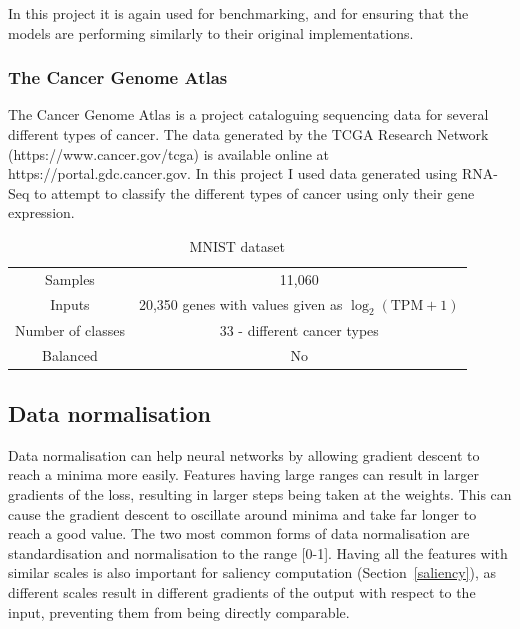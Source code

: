 In this project it is again used for benchmarking, and for ensuring that the models are performing similarly to their original implementations.

\subsubsection{The Cancer Genome Atlas}
The Cancer Genome Atlas is a project cataloguing sequencing data for several different types of cancer. The data generated by the TCGA Research 
Network (https://www.cancer.gov/tcga) is available online at https://portal.gdc.cancer.gov. In this project I used data generated using 
RNA-Seq to attempt to classify the different types of cancer using only their gene expression.
\begin{table}[H]
  \label{tab:tcga}
  \small %
  \centering %
  \begin{tabular}{cc} %
  \toprule[\heavyrulewidth]
  Samples & 11,060 \\
  Inputs & 20,350 genes with values given as $\log_{2}(\text{TPM}+1)$ \footnotemark \\
  Number of classes & 33 - different cancer types\\
  Balanced & No \\
  \bottomrule[\heavyrulewidth] 
  \end{tabular}
  \caption{MNIST dataset} 
\end{table}

\subsection{Data normalisation} \label{normalise}
Data normalisation can help neural networks by allowing gradient descent to reach a minima more easily. Features having large ranges
can result in larger gradients of the loss, resulting in larger steps being taken at the weights. This can cause the 
gradient descent to oscillate around minima and take far longer to reach a good value. The two most common forms of data normalisation 
are standardisation and normalisation to the range [0-1]. Having all the features with similar scales is also important for saliency computation
(Section~\ref{saliency}),
as different scales result in different gradients of the output with respect to the input, preventing them from being directly comparable.

